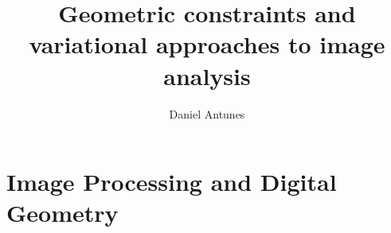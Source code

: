 \documentclass[a4paper,12pt]{book}
\begin{document}
	\title{Geometric constraints and variational approaches to image analysis}
	\author{Daniel Antunes}
	\date{}
	\maketitle
	
	\newpage

		
	\newpage
	
	
	\tableofcontents	
	
	
	\part{Image Processing and Digital Geometry}
	
	
%	
%	
%	
%	
%		
%	
%	
	\begin{appendices}
%					
%		
%						
				
%					
%				
	\end{appendices}
	
	

%
\printbibliography
	
\end{document}
